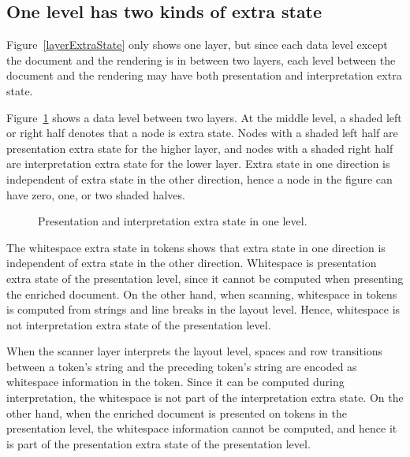 \subsection{One level has two kinds of extra state} \label{sect:oneLevelDoubleES}

Figure~\ref{layerExtraState} only shows one layer, but since each data level except the document and the rendering is in between two layers, each level between the document and the rendering may have both presentation and interpretation extra state. 

Figure~\ref{levelExtraState} shows a data level between two layers. At the middle level, a shaded left or right half denotes that a node is extra state. Nodes with a shaded left half are presentation extra state for the higher layer, and nodes with a shaded right half are interpretation extra state for the lower layer. Extra state in one direction is independent of extra state in the other direction, hence a node in the figure can have zero, one, or two shaded halves.

\begin{figure}
\begin{center}
\begin{center}
\end{center}
\caption{Presentation and interpretation extra state in one level.}\label{levelExtraState} 
\end{center}
\end{figure}

The whitespace extra state in tokens shows that extra state in one direction is independent of extra state in the other direction. Whitespace is presentation extra state of the presentation level, since it cannot be computed when presenting the enriched document. On the other hand, when scanning, whitespace in tokens is computed from strings and line breaks in the layout level. Hence, whitespace is not interpretation extra state of the presentation level.



\bc
When the scanner layer interprets the layout level, spaces and row transitions between a token's string and the preceding token's string are encoded as whitespace information in the token. Since it can be computed during interpretation, the whitespace is not part of the interpretation extra state. On the other hand, when the enriched document is presented on tokens in the presentation level, the whitespace information cannot be computed, and hence it is part of the presentation extra state of the presentation level.
\ec

